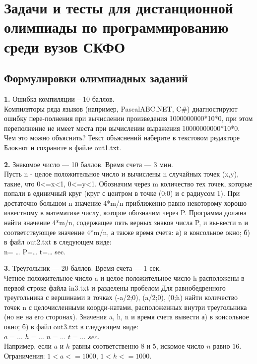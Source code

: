 \chapter{Задачи и тесты для дистанционной олимпиады по программированию среди вузов СКФО}





\section{Формулировки олимпиадных заданий}

\textbf{1.} Ошибка компиляции – 10 баллов.\\
Компиляторы ряда языков (например, PascalABC.NET, C\#) диагностируют ошибку пере-полнения при вычислении произведения
1000000000*10*0,
при этом переполнение не имеет места при вычислении выражения 10000000000*10*0.
\\
Чем это можно объяснить? Текст объяснений наберите в текстовом редакторе Блокнот и сохраните в файле out1.txt.


\textbf{2.} Знакомое число --- 10 баллов. Время счета --- 3 мин.\\
Пусть n - целое положительное число и вычислены n случайных точек (x,y), такие, что 0<=x<1, 0<=y<1. Обозначим через m количество тех точек, которые попали в единичный круг (круг с центром в точке (0;0) и с радиусом 1). При достаточно большом n значение 4*m/n приближенно равно некоторому хорошо известному в математике числу, которое обозначим через P.
Программа должна найти значение 4*m/n, содержащее пять верных знаков числа P, и вы-вести n и соответствующее значение 4*m/n, а также время счета: а) в консольное окно; б) в файл out2.txt в следующем виде:\\
n= …         P=…         t=…    sec.


\textbf{3.} Треугольник --- 20 баллов. Время счета --- 1 сек.\\
Четное положительное число a и целое положительное число h расположены в первой строке файла in3.txt и разделены пробелом Для равнобедренного треугольника с вершинами в точках (-a/2;0), (a/2;0), (0;h) найти количество точек n с целочисленными коорди-натами, расположенных внутри треугольника (но не на его сторонах). Значения a, h, n и время счета вывести а) в консольное окно; б) в файл out3.txt в следующем виде:\\
$a = \ldots$ $h= \ldots$ $n= \ldots$ $t= \ldots$ $sec$.\\
Например, если $a$ и $h$ равны соответственно $8$ и $5$, искомое число $n$ равно $16$.\\
Ограничения: $1<a<=1000$, $1<h<=1000$.


